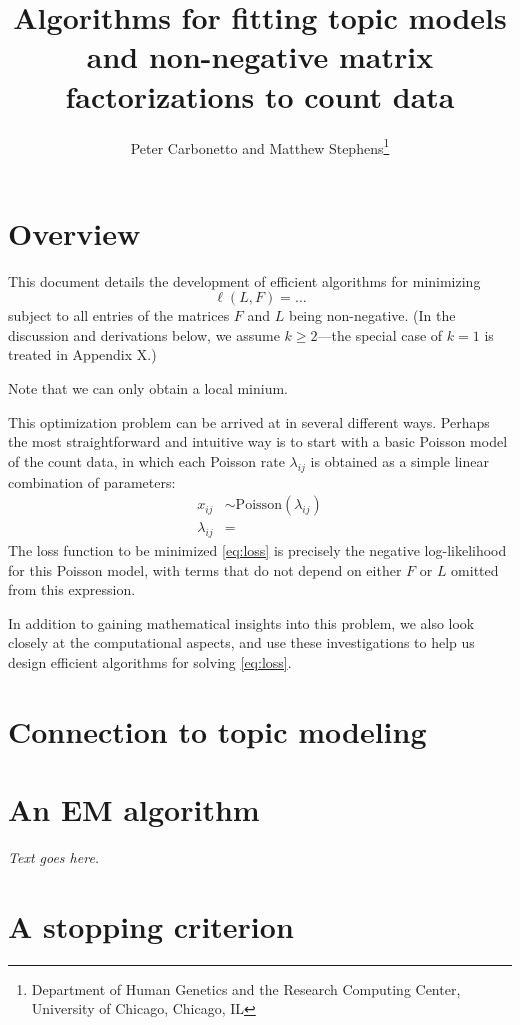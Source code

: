 \documentclass[final]{siamart171218}
\title{Algorithms for fitting topic models and non-negative matrix 
  factorizations to count data}
\author{Peter Carbonetto and Matthew Stephens\thanks{Department of 
  Human Genetics and the Research Computing Center, University of 
  Chicago, Chicago, IL}}
\begin{document}
\maketitle

\section{Overview}

This document details the development of efficient algorithms for
minimizing 
\begin{equation}
\ell(L,F) = \ldots
\label{eq:loss}
\end{equation}
subject to all entries of the matrices $F$ and $L$ being
non-negative. (In the discussion and derivations below, we assume $k
\geq 2$---the special case of $k = 1$ is treated in Appendix X.)

Note that we can only obtain a local minium.

This optimization problem can be arrived at in several different
ways. Perhaps the most straightforward and intuitive way is to start
with a basic Poisson model of the count data, in which each Poisson
rate $\lambda_{ij}$ is obtained as a simple linear combination of
parameters:
\begin{align*}
x_{ij}       &\sim \mathrm{Poisson}(\lambda_{ij}) \\
\lambda_{ij} &=
\end{align*}
The loss function to be minimized \eqref{eq:loss} is precisely the
negative log-likelihood for this Poisson model, with terms that do not
depend on either $F$ or $L$ omitted from this expression.

In addition to gaining mathematical insights into this problem, we
also look closely at the computational aspects, and use these
investigations to help us design efficient algorithms for
solving \eqref{eq:loss}.

\section{Connection to topic modeling}

\section{An EM algorithm}

{\em Text goes here.}

\section{A stopping criterion}
\end{document}
